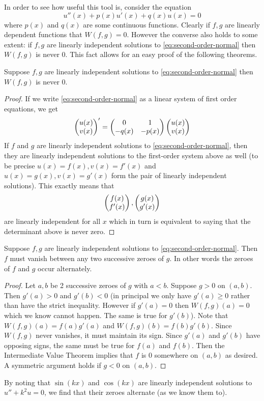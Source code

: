 In order to see how useful this tool is, consider the equation
\begin{equation}\label{eq:second-order-normal}
    u''(x) + p(x) u'(x) + q(x) u(x) = 0 
\end{equation}
where $p(x)$ and $q(x)$ are some continuous functions. 
Clearly if $f, g$ are linearly dependent functions that $W(f, g) = 0$. However the converse also holds to some extent: if $f, g$ are linearly independent solutions to \autoref{eq:second-order-normal} then $W(f, g)$ is never 0. This fact allows for an easy proof of the following theorems.

\begin{lemma}
Suppose $f, g$ are linearly independent solutions to \autoref{eq:second-order-normal} then $W(f, g)$ is never 0.
\end{lemma}
\begin{proof}
If we write \autoref{eq:second-order-normal} as a linear system of first order equations, we get
\begin{align*}
    \begin{pmatrix} u(x) \\ v(x) \end{pmatrix}' = \begin{pmatrix} 0 & 1\\-q(x) & -p(x) \end{pmatrix} \begin{pmatrix} u(x) \\ v(x) \end{pmatrix}
\end{align*}
If $f$ and $g$ are linearly independent solutions to \autoref{eq:second-order-normal}, then they are linearly independent solutions to the first-order system above as well (to be precise $u(x) = f(x), v(x) = f'(x)$ and $u(x) = g(x), v(x) = g'(x)$ form the pair of linearly independent solutions).
This exactly means that
$$ \begin{pmatrix} f(x)\\f'(x) \end{pmatrix}, \begin{pmatrix} g(x) \\ g'(x) \end{pmatrix} $$
are linearly independent for all $x$ which in turn is equivalent to saying that the determinant above is never zero.
\end{proof}

\begin{theorem}
Suppose $f, g$ are linearly independent solutions to \eqref{eq:second-order-normal}. Then $f$ must vanish between any two successive zeroes of $g$. In other words the zeroes of $f$ and $g$ occur alternately.
\end{theorem}
\begin{proof}
Let $a, b$ be 2 successive zeroes of $g$ with $a < b$. Suppose $g > 0$ on $(a, b)$. Then $g'(a) > 0$ and $g'(b) < 0$ (in principal we only have $g'(a) \geq 0$ rather than have the strict inequality. However if $g'(a) = 0$ then $W(f, g)(a) = 0$ which we know cannot happen. The same is true for $g'(b)$). Note that $W(f, g)(a) = f(a) g'(a)$ and $W(f, g)(b) = f(b) g'(b)$. Since $W(f, g)$ never vanishes, it must maintain its sign. Since $g'(a)$ and $g'(b)$ have opposing signs, the same must be true for $f(a)$ and $f(b)$. Then the Intermediate Value Theorem implies that $f$ is 0 somewhere on $(a, b)$ as desired. A symmetric argument holds if $g < 0$ on $(a, b)$.
\end{proof}
\begin{remark}
By noting that $\sin (kx)$ and $\cos (kx)$ are linearly independent solutions to $u'' + k^2 u = 0$, we find that their zeroes alternate (as we know them to).
\end{remark}

